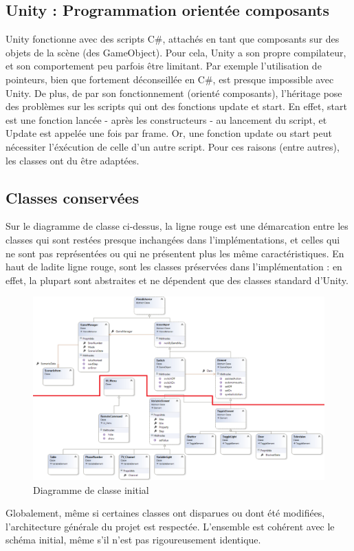 \subsection{Unity : Programmation orientée composants}

Unity fonctionne avec des scripts C\#, attachés en tant que composants sur des objets de la scène (des GameObject).
Pour cela, Unity a son propre compilateur, et son comportement peu parfois être limitant.
Par exemple l'utilisation de pointeurs, bien que fortement déconseillée en C\#, est presque impossible avec Unity. De plus, de par son fonctionnement (orienté composants), l'héritage pose des problèmes sur les scripts qui ont des fonctions update et start.
En effet, start est une fonction lancée - après les constructeurs - au lancement du script, et Update est appelée une fois par frame.
Or, une fonction update ou start peut nécessiter l'éxécution de celle d'un autre script. Pour ces raisons (entre autres), les classes ont du être adaptées.

\subsection{Classes conservées}

Sur le diagramme de classe ci-dessus, la ligne rouge est une démarcation entre les classes qui sont restées presque inchangées dans l'implémentations, et celles qui ne sont pas représentées ou qui ne présentent plus les même caractéristiques. En haut de ladite ligne rouge, sont les classes préservées dans l'implémentation : en effet, la plupart sont abstraites et ne dépendent que des classes standard d'Unity.

\begin{figure}[h]
	\centering
		\includegraphics[width=\linewidth]{7-RapportFinal/img/diagClasses_rectif.png}
		\caption{Diagramme de classe initial}
		\label{diagClasses_rectif}
	
\end{figure}

Globalement, même si certaines classes ont disparues ou dont été modifiées, l'architecture générale du projet est respectée. L'ensemble est cohérent avec le schéma initial, même s'il n'est pas rigoureusement identique.






